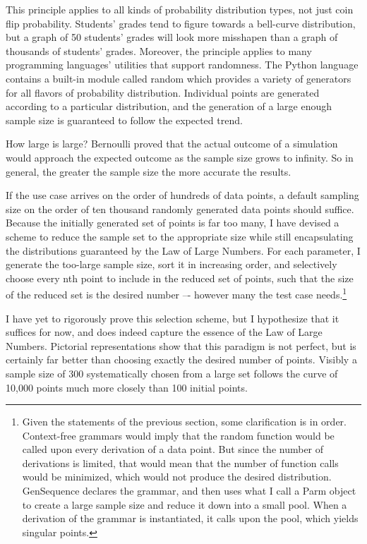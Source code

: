 This principle applies to all kinds of probability distribution types, not just coin flip probability. Students’ grades tend to figure towards a bell-curve distribution, but a graph of 50 students’ grades will look more misshapen than a graph of thousands of students’ grades. Moreover, the principle applies to many programming languages’ utilities that support randomness. The Python language contains a built-in module called random which provides a variety of generators for all flavors of probability distribution. Individual points are generated according to a particular distribution, and the generation of a large enough sample size is guaranteed to follow the expected trend.

How large is large? Bernoulli proved that the actual outcome of a simulation would approach the expected outcome as the sample size grows to infinity. So in general, the greater the sample size the more accurate the results.

If the use case arrives on the order of hundreds of data points, a default sampling size on the order of ten thousand randomly generated data points should suffice. Because the initially generated set of points is far too many, I have devised a scheme to reduce the sample set to the appropriate size while still encapsulating the distributions guaranteed by the Law of Large Numbers. For each parameter, I generate the too-large sample size, sort it in increasing order, and selectively choose every nth point to include in the reduced set of points, such that the size of the reduced set is the desired number –-  however many the test case needs.\footnote{Given the statements of the previous section, some clarification is in order. Context-free grammars would imply that the random function would be called upon every derivation of a data point. But since the number of derivations is limited, that would mean that the number of function calls would be minimized, which would not produce the desired distribution. GenSequence declares the grammar, and then uses what I call a Parm object to create a large sample size and reduce it down into a small pool. When a derivation of the grammar is instantiated, it calls upon the pool, which yields singular points.}

I have yet to rigorously prove this selection scheme, but I hypothesize that it suffices for now, and does indeed capture the essence of the Law of Large Numbers. Pictorial representations show that this paradigm is not perfect, but is certainly far better than choosing exactly the desired number of points. Visibly a sample size of 300 systematically chosen from a large set follows the curve of 10,000 points much more closely than 100 initial points.

